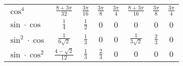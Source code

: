 \begin{tabularx}{\linewidth}{@{}lccccccc@{}}
    $\cos^4$            & $\frac{8+3\pi}{32}$              & $\frac{3\pi}{16}$               & $\frac{3\pi}{8}$      & $\frac{3\pi}{4}$       & $\frac{8+3\pi}{16}$                             & $\frac{3\pi}{8}$                                & $\frac{3\pi}{4}$           \\
    $\sin \cdot \cos$   & $\frac{1}{4}$                    & $\frac{1}{2}$                   & 0                     & 0                      & 0                                               & 0                                               & 0                          \\
    $\sin^2 \cdot \cos$ & $\frac{1}{6\sqrt{2}}$            & $\frac{1}{3}$                   & 0                     & 0                      & $\frac{1}{3\sqrt{2}}$                           & $\frac{2}{3}$                                   & 0                          \\
    $\sin \cdot \cos^2$ & $\frac{4-\sqrt{2}}{12}$          & $\frac{1}{3}$                   & $\frac{2}{3}$         & 0                      & 0                                               & 0                                               & 0                          \\
\end{tabularx}
\renewcommand{\arraystretch}{1}
\setlength\tabcolsep{6pt} %

